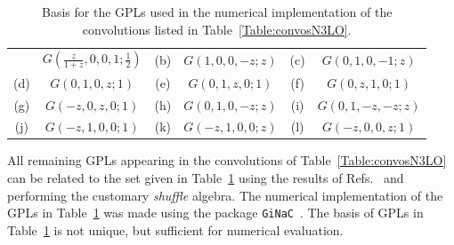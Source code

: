 \documentclass[12pt]{article}
\begin{document}
\begin{appendix}
\begin{table}
\begin{center}
\begin{tabular}{ |c|c||c|c||c|c| }
& $G(\frac{z}{1+z},0,0,1;\frac{1}{2})$

& \multirow{1}{*}{(b)} 

& $G(1,0,0,-z;z)$ 

& \multirow{1}{*}{(c)} 

& $G(0,1,0,-1;z)$  \\

\multirow{1}{*}{(d)} 

& $G(0,1,0,z;1)$



& \multirow{1}{*}{(e)} 

& $G(0,1,z,0;1)$  

& \multirow{1}{*}{(f)} 

& $G(0,z,1,0;1)$\\

\multirow{1}{*}{(g)} 

& $G(-z,0,z,0;1)$ 

& \multirow{1}{*}{(h)} 

& $G(0,1,0,-z;z)$  

&\multirow{1}{*}{(i)} 

& $G(0,1,-z,-z;z)$\\

 \multirow{1}{*}{(j)} 

& $G(-z,1,0,0;1)$ 

& \multirow{1}{*}{(k)} 

& $G(-z,1,0,0;z)$  

& \multirow{1}{*}{(l)} 

& $G(-z,0,0,z;1)$

\\  

\hline
\end{tabular}
\caption{\label{Table:GPLsused}
{Basis for the GPLs used in the numerical implementation of the convolutions listed in Table~\ref{Table:convosN3LO}. 
}}
\renewcommand{\arraystretch}{1}
\end{center}
\end{table}
All remaining GPLs appearing in the convolutions of Table~\ref{Table:convosN3LO} can be related to the set given in Table~\ref{Table:GPLsused} using the results of Refs.~\cite{Frellesvig:2016ske,Maitre:2005uu,Duhr:2011zq} and performing the customary \textit{shuffle} algebra. The numerical implementation of the GPLs in Table~\ref{Table:GPLsused} was made using the package \texttt{GiNaC}~\cite{Bauer:2000cp,Vollinga:2004sn}. The basis of GPLs in Table~\ref{Table:GPLsused} is not unique, but 
sufficient for  numerical evaluation.


\end{appendix}
\end{document}
